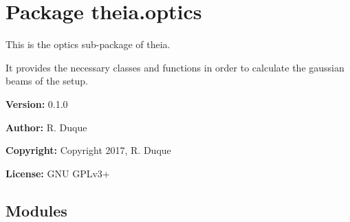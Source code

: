 %
%
%


\section{Package theia.optics}

    \label{theia:optics}
This is the optics sub-package of theia.

It provides the necessary classes and functions in order to calculate the 
gaussian beams of the setup.

\textbf{Version:} 0.1.0



\textbf{Author:} R. Duque



\textbf{Copyright:} Copyright 2017, R. Duque



\textbf{License:} GNU GPLv3+





\subsection{Modules}

